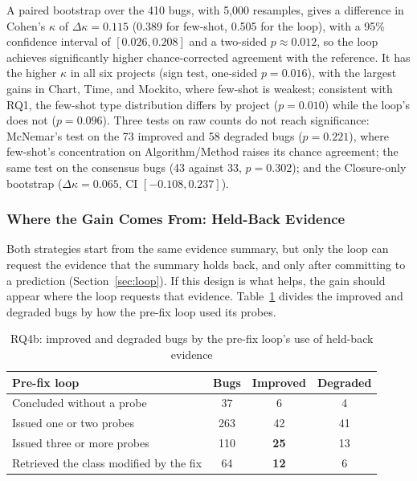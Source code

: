 \documentclass{iutbscthesis}
\begin{document}
A paired bootstrap over the 410 bugs, with 5{,}000 resamples, gives a difference in Cohen's $\kappa$ of $\Delta\kappa = 0.115$ (0.389 for few-shot, 0.505 for the loop), with a 95\% confidence interval of $[0.026, 0.208]$ and a two-sided $p \approx 0.012$, so the loop achieves significantly higher chance-corrected agreement with the reference. It has the higher $\kappa$ in all six projects (sign test, one-sided $p = 0.016$), with the largest gains in Chart, Time, and Mockito, where few-shot is weakest; consistent with RQ1, the few-shot type distribution differs by project ($p = 0.010$) while the loop's does not ($p = 0.096$). Three tests on raw counts do not reach significance: McNemar's test on the 73 improved and 58 degraded bugs ($p = 0.221$), where few-shot's concentration on Algorithm/\allowbreak Method raises its chance agreement; the same test on the consensus bugs (43 against 33, $p = 0.302$); and the Closure-only bootstrap ($\Delta\kappa = 0.065$, CI $[-0.108, 0.237]$).

\subsubsection{Where the Gain Comes From: Held-Back Evidence}
\label{sec:rq4b_evidence}

Both strategies start from the same evidence summary, but only the loop can request the evidence that the summary holds back, and only after committing to a prediction (Section~\ref{sec:loop}). If this design is what helps, the gain should appear where the loop requests that evidence. Table~\ref{tab:rq4b_probes} divides the improved and degraded bugs by how the pre-fix loop used its probes.

\begin{table}[!htbp]
    \centering
    \begin{tabular}{p{6.4cm} c c c}
        \toprule
        \textbf{Pre-fix loop} & \textbf{Bugs} & \textbf{Improved} & \textbf{Degraded} \\
        \midrule
        Concluded without a probe & 37 & 6 & 4 \\
        Issued one or two probes & 263 & 42 & 41 \\
        Issued three or more probes & 110 & \textbf{25} & 13 \\
        \midrule
        Retrieved the class modified by the fix & 64 & \textbf{12} & 6 \\
        \bottomrule
    \end{tabular}
    \caption{RQ4b: improved and degraded bugs by the pre-fix loop's use of held-back evidence}
    \label{tab:rq4b_probes}
\end{table}
\end{document}
